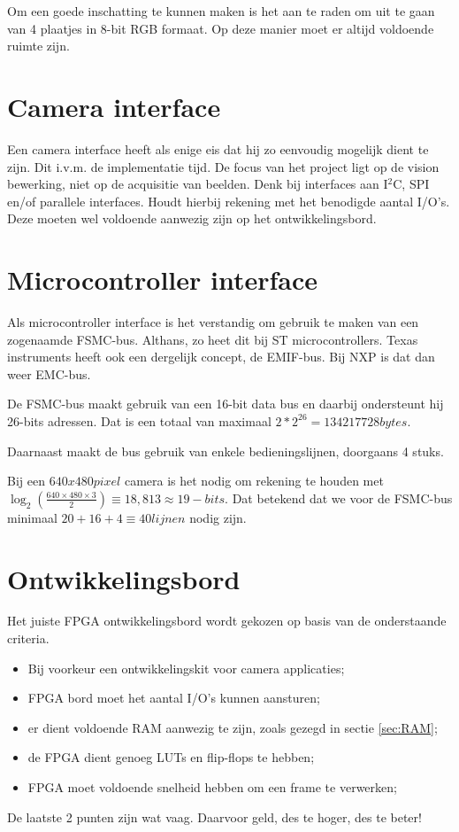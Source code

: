 Om een goede inschatting te kunnen maken is het aan te raden om uit
te gaan van 4 plaatjes in 8-bit RGB formaat. Op deze manier moet er
altijd voldoende ruimte zijn.

\section{Camera interface}
\label{sec:caminter}
Een camera interface heeft als enige eis dat hij zo eenvoudig mogelijk
dient te zijn. Dit i.v.m. de implementatie tijd. De focus van het project
ligt op de vision bewerking, niet op de acquisitie van beelden.
Denk bij interfaces aan I$^2$C, SPI en/of parallele interfaces. Houdt
hierbij rekening met het benodigde aantal I/O's. Deze moeten wel voldoende
aanwezig zijn op het ontwikkelingsbord.

\section{Microcontroller interface}
\label{sec:ucinter}
Als microcontroller interface is het verstandig om gebruik te maken van
een zogenaamde FSMC-bus. Althans, zo heet dit bij ST microcontrollers.
Texas instruments heeft ook een dergelijk concept, de EMIF-bus.
Bij NXP is dat dan weer EMC-bus.

De FSMC-bus maakt gebruik van een 16-bit data bus en daarbij ondersteunt
hij 26-bits adressen. Dat is een totaal van maximaal $2*2^26 = 134217728 bytes$.

Daarnaast maakt de bus gebruik van enkele bedieningslijnen, doorgaans 4 stuks.

Bij een $640x480 pixel$ camera is het nodig om rekening te houden met $\log _2 \left(\frac{640 \times 480 \times 3}{2} \right) \equiv 18,813 \approx 19-bits$. Dat betekend dat we voor de FSMC-bus minimaal $ 20 + 16 + 4 \equiv 40  lijnen$ nodig zijn.

\section{Ontwikkelingsbord}
\label{doc:ontwb}
Het juiste FPGA ontwikkelingsbord wordt gekozen op basis van de onderstaande criteria.

\begin{itemize}
	\item Bij voorkeur een ontwikkelingskit voor camera applicaties;
	\item FPGA bord moet het aantal I/O's kunnen aansturen;
	\item er dient voldoende RAM aanwezig te zijn, zoals gezegd in sectie \ref{sec:RAM};
	\item de FPGA dient genoeg LUTs en flip-flops te hebben;
	\item FPGA moet voldoende snelheid hebben om een frame te verwerken;
\end{itemize}
De laatste 2 punten zijn wat vaag. Daarvoor geld, des te hoger, des te beter!